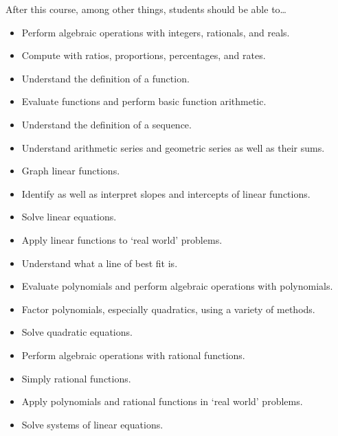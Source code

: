 \documentclass[11pt,letterpaper]{article}
\begin{document}
After this course, among other things, students should be able to\dots
	\begin{itemize} \itemsep=0.3ex
	\item Perform algebraic operations with integers, rationals, and reals. 
	\item Compute with ratios, proportions, percentages, and rates. 
	\item Understand the definition of a function.
	\item Evaluate functions and perform basic function arithmetic. 
	\item Understand the definition of a sequence. 
	\item Understand arithmetic series and geometric series as well as their sums.
	\item Graph linear functions. 
	\item Identify as well as interpret slopes and intercepts of linear functions.
	\item Solve linear equations. 
	\item Apply linear functions to `real world' problems.  
	\item Understand what a line of best fit is. 
	\item Evaluate polynomials and perform algebraic operations with polynomials.
	\item Factor polynomials, especially quadratics, using a variety of methods.
	\item Solve quadratic equations.
	\item Perform algebraic operations with rational functions. 
	\item Simply rational functions. 
	\item Apply polynomials and rational functions in `real world' problems.
	\item Solve systems of linear equations. 
	\end{itemize}
\end{document}

